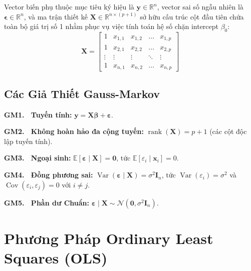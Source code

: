 \documentclass[12pt,a4paper]{report}
\begin{document}
Vector biến phụ thuộc mục tiêu ký hiệu là $\mathbf{y} \in \mathbb{R}^n$, vector sai số ngẫu nhiên là $\boldsymbol{\epsilon} \in \mathbb{R}^n$, và ma trận thiết kế $\mathbf{X} \in \mathbb{R}^{n \times (p+1)}$ sở hữu cấu trúc cột đầu tiên chứa toàn bộ giá trị số 1 nhằm phục vụ việc tính toán hệ số chặn intercept $\beta_0$:
\begin{equation}
    \mathbf{X} = \begin{bmatrix} 
    1 & x_{1,1} & x_{1,2} & \dots & x_{1,p} \\
    1 & x_{2,1} & x_{2,2} & \dots & x_{2,p} \\
    \vdots & \vdots & \vdots & \ddots & \vdots \\
    1 & x_{n,1} & x_{n,2} & \dots & x_{n,p}
    \end{bmatrix}
\end{equation}

\subsection{Các Giả Thiết Gauss-Markov}

\begin{tcolorbox}[
  enhanced,
  colback=white,
  colframe=infoborder,
  colbacktitle=infoborder,
  coltitle=white,
  title={Các giả thiết Gauss--Markov (GM1 -- GM5)},
  fonttitle=\bfseries,
  boxrule=1pt,
  arc=4pt,
  left=12pt, right=12pt, top=10pt, bottom=10pt,
  before skip=0.8em,
  after skip=0.8em
]
\textbf{GM1. \ Tuyến tính:} $\mathbf{y} = \mathbf{X}\boldsymbol{\beta} + \boldsymbol{\varepsilon}$.

\medskip
\textbf{GM2. \ Không hoàn hảo đa cộng tuyến:}
$\operatorname{rank}(\mathbf{X}) = p + 1$ (các cột độc lập tuyến tính).

\medskip
\textbf{GM3. \ Ngoại sinh:}
$\mathbb{E}[\boldsymbol{\varepsilon}\mid\mathbf{X}] = \mathbf{0}$,
tức $\mathbb{E}[\varepsilon_i\mid\mathbf{x}_i] = 0$.

\medskip
\textbf{GM4. \ Đồng phương sai:}
$\operatorname{Var}(\boldsymbol{\varepsilon}\mid\mathbf{X}) = \sigma^2\mathbf{I}_n$,
tức $\operatorname{Var}(\varepsilon_i) = \sigma^2$ và
$\operatorname{Cov}(\varepsilon_i,\varepsilon_j) = 0$ với $i \ne j$.

\medskip
\textbf{GM5. \ Phần dư Chuẩn:}
$\boldsymbol{\varepsilon}\mid\mathbf{X}\sim\mathcal{N}(\mathbf{0},\sigma^2\mathbf{I}_n)$.
\end{tcolorbox}

\section{Phương Pháp Ordinary Least Squares (OLS)}
\end{document}
